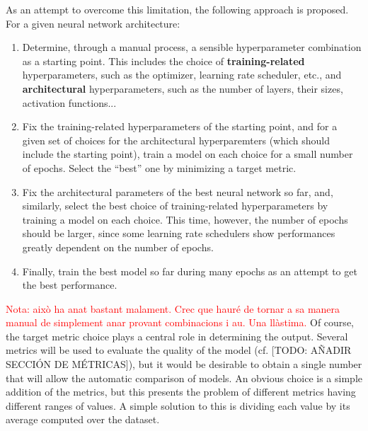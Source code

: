 \documentclass[twocolumn,twoside,a4paper,10pt]{IEEEtran}
\newcommand{\Frank}[1]{\textcolor{red}{#1}}
\begin{document}
As an attempt to overcome this limitation, the following approach is proposed. For a given neural network architecture:
\begin{enumerate}
  \item Determine, through a manual process, a sensible hyperparameter combination as a starting point. This includes the choice of \textbf{training-related} hyperparameters, such as the optimizer, learning rate scheduler, etc., and \textbf{architectural} hyperparameters, such as the number of layers, their sizes, activation functions...
  \item Fix the training-related hyperparameters of the starting point, and for a given set of choices for the architectural hyperparemters (which should include the starting point), train a model on each choice for a small number of epochs. Select the ``best'' one by minimizing a target metric.
  \item Fix the architectural parameters of the best neural network so far, and, similarly, select the best choice of training-related hyperparameters by training a model on each choice. This time, however, the number of epochs should be larger, since some learning rate schedulers show performances greatly dependent on the number of epochs.
  \item Finally, train the best model so far during many epochs as an attempt to get the best performance.
\end{enumerate}
\Frank{Nota: això ha anat bastant malament. Crec que hauré de tornar a sa manera manual de simplement anar provant combinacions i au. Una llàstima.}
Of course, the target metric choice plays a central role in determining the output. Several metrics will be used to evaluate the quality of the model (cf. [TODO: AÑADIR SECCIÓN DE MÉTRICAS]), but it would be desirable to obtain a single number that will allow the automatic comparison of models. An obvious choice is a simple addition of the metrics, but this presents the problem of different metrics having different ranges of values. A simple solution to this
is dividing each value by its average computed over the dataset.
\end{document}
